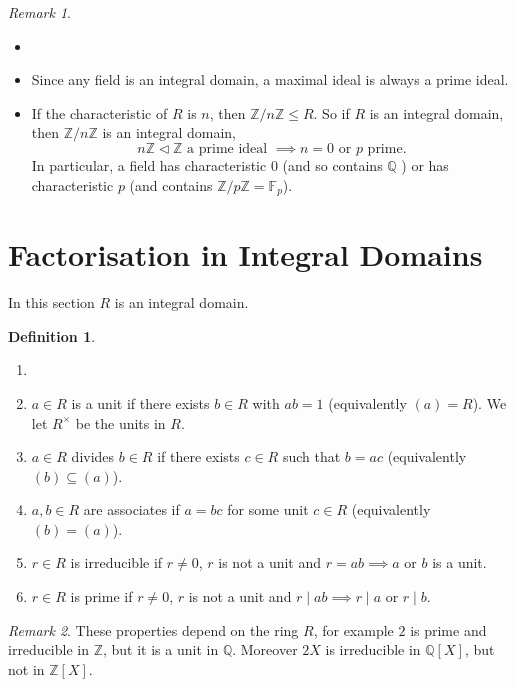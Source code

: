 \documentclass[12pt]{article}
\theoremstyle{definition}
\newtheorem{definition}{Definition}[section]
\theoremstyle{remark}
\newtheorem*{remark}{Remark}
\begin{document}
\begin{remark}
	\begin{itemize}
		\item[]
		\item Since any field is an integral domain, a maximal ideal is always a prime ideal.
		\item If the characteristic of $R$ is $n$, then $\mathbb{Z} / n \mathbb{Z} \leq R$. So if $R$ is an integral domain, then $\mathbb{Z} / n \mathbb{Z}$ is an integral domain,
		\[
				n \mathbb{Z} \lhd \mathbb{Z} \text{ a prime ideal } \implies n = 0 \text{ or } p \text{ prime}.
		\]
		In particular, a field has characteristic 0 (and so contains $\mathbb{Q}$ ) or has characteristic $p$ (and contains $\mathbb{Z} / p \mathbb{Z} = \mathbb{F}_p$).	
	\end{itemize}
\end{remark}

\newpage
\section{Factorisation in Integral Domains}%
\label{sec:factorisation_in_integral_domains}

In this section $R$ is an integral domain.

\begin{definition}
	\begin{enumerate}[label = (\roman*)]
		\item[]
		\item $a \in R$ is a unit if there exists $b \in R$ with $ab = 1$ (equivalently $(a) = R$). We let $R^{\times}$ be the units in $R$.
		\item $a \in R$ divides $b \in R$ if there exists $c \in R$ such that $b = ac$ (equivalently $(b) \subseteq (a)$).
		\item $a, b \in R$ are associates if $a = bc$ for some unit $c \in R$ (equivalently $(b) = (a)$).
		\item $r \in R$ is irreducible if $r \neq 0$, $r$ is not a unit and $r = ab \implies a$ or $b$ is a unit.
		\item $r \in R$ is prime if $r \neq 0$, $r$ is not a unit and $r \mid ab \implies r \mid a$ or $r \mid b$.
	\end{enumerate}
\end{definition}

\begin{remark}
	These properties depend on the ring $R$, for example $2$ is prime and irreducible in $\mathbb{Z}$, but it is a unit in $\mathbb{Q}$. Moreover $2X$ is irreducible in $\mathbb{Q}[X]$, but not in $\mathbb{Z}[X]$.
\end{remark}
\end{document}
